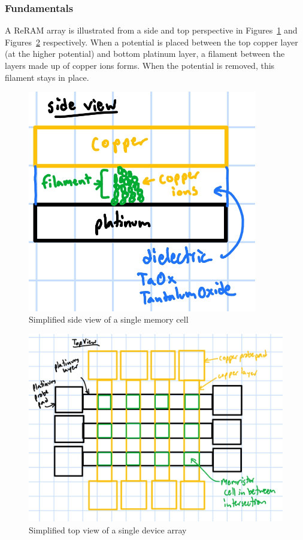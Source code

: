 \documentclass{article}
\begin{document}
        \subsubsection{Fundamentals}
          A ReRAM array is illustrated from a side and top perspective in Figures~\ref{sideview} and
          Figures~\ref{topview} respectively. When a potential is placed between the top copper layer (at the higher
          potential) and bottom platinum layer, a filament between the layers made up of copper ions forms. When the
          potential is removed, this filament stays in place.

          \begin{figure}[H]
            \centering
            \includegraphics[width=10cm]{./figures/sideview_drawing.jpg}
            \caption{Simplified side view of a single memory cell}
            \label{sideview}
          \end{figure}
          \begin{figure}[H]
            \centering
            \includegraphics[width=\textwidth]{./figures/topview_drawing.jpg}
            \caption{Simplified top view of a single device array}
            \label{topview}
          \end{figure}
\end{document}
